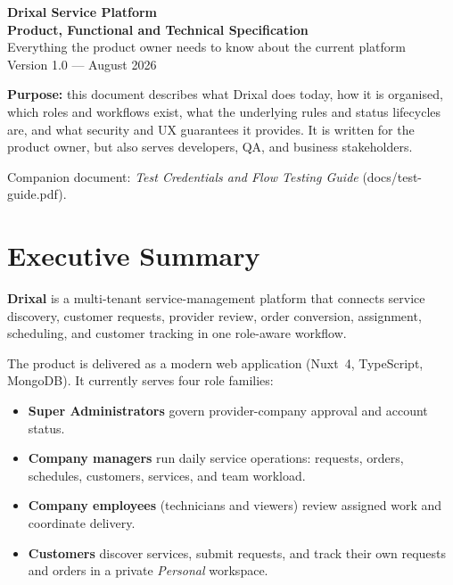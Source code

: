 \documentclass[11pt,a4paper]{article}
\begin{document}
\begin{titlepage}
  \centering
  \vspace*{2.2cm}
  {\Huge\bfseries\color{drixalblue} Drixal Service Platform}\\[0.6cm]
  {\Large\bfseries Product, Functional and Technical Specification}\\[1.0cm]
  {\large\color{drixalmuted} Everything the product owner needs to know about the current platform}\\[0.4cm]
  {\large\color{drixalmuted} Version 1.0 --- August 2026}\\[2cm]
  \begin{notebox}
    \textbf{Purpose:} this document describes what Drixal does today, how it is organised, which roles and workflows exist, what the underlying rules and status lifecycles are, and what security and UX guarantees it provides. It is written for the product owner, but also serves developers, QA, and business stakeholders.
  \end{notebox}
  \vfill
  {\small\color{drixalmuted} Companion document: \emph{Test Credentials and Flow Testing Guide} (docs/test-guide.pdf).}
\end{titlepage}

\tableofcontents
\clearpage

\section{Executive Summary}
\label{sec:summary}

\textbf{Drixal} is a multi-tenant service-management platform that connects service discovery, customer requests, provider review, order conversion, assignment, scheduling, and customer tracking in one role-aware workflow.

The product is delivered as a modern web application (Nuxt~4, TypeScript, MongoDB). It currently serves four role families:

\begin{itemize}[leftmargin=2em, itemsep=2pt]
  \item \textbf{Super Administrators} govern provider-company approval and account status.
  \item \textbf{Company managers} run daily service operations: requests, orders, schedules, customers, services, and team workload.
  \item \textbf{Company employees} (technicians and viewers) review assigned work and coordinate delivery.
  \item \textbf{Customers} discover services, submit requests, and track their own requests and orders in a private \emph{Personal} workspace.
\end{itemize}
\end{document}
